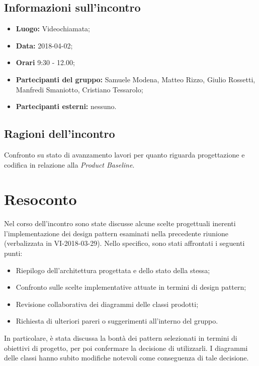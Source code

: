 \documentclass[openany,12pt,a4paper]{article}
\begin{document}
  \subsection{Informazioni sull'incontro} 
   
  \begin{itemize}  
      \item \textbf{Luogo:} Videochiamata;
      \item \textbf{Data:} 2018-04-02; 
      \item \textbf{Orari} 9:30 - 12.00;
      \item \textbf{Partecipanti del gruppo:} Samuele Modena, Matteo Rizzo, Giulio Rossetti, Manfredi Smaniotto, Cristiano Tessarolo; 
      \item \textbf{Partecipanti esterni:} nessuno. 
  \end{itemize} 
 
  \subsection{Ragioni dell'incontro} 
  Confronto su stato di avanzamento lavori per quanto riguarda progettazione e codifica in relazione alla \textit{Product Baseline}.
 
  \section{Resoconto} 
  Nel corso dell'incontro sono state discusse alcune scelte progettuali inerenti l'implementazione dei design pattern esaminati nella precedente riunione (verbalizzata in VI-2018-03-29). Nello specifico, sono stati affrontati i seguenti punti:
	
  \begin{itemize}
	\item Riepilogo dell'architettura progettata e dello stato della stessa;
	\item Confronto sulle scelte implementative attuate in termini di design pattern;
	\item Revisione collaborativa dei diagrammi delle classi prodotti;
	\item Richiesta di ulteriori pareri o suggerimenti all'interno del gruppo.
  \end{itemize}

  In particolare, è stata discussa la bontà dei pattern selezionati in termini di obiettivi di progetto, per poi confermare la decisione di utilizzarli. I diagrammi delle classi hanno subito modifiche notevoli come conseguenza di tale decisione. 
 
\end{document}
